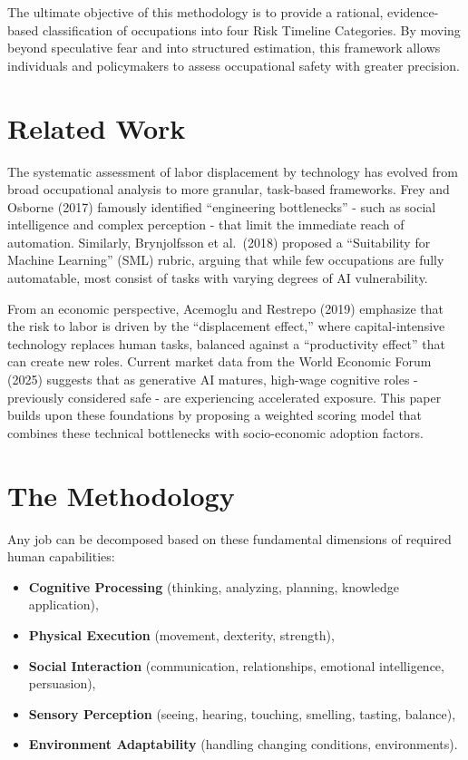 \documentclass[
  11pt,
]{article}
\providecommand{\tightlist}{%
  \setlength{\itemsep}{0pt}\setlength{\parskip}{0pt}}
\begin{document}
The ultimate objective of this methodology is to provide a rational,
evidence-based classification of occupations into four Risk Timeline
Categories. By moving beyond speculative fear and into structured
estimation, this framework allows individuals and policymakers to assess
occupational safety with greater precision.

\section{Related Work}\label{related-work}

The systematic assessment of labor displacement by technology has
evolved from broad occupational analysis to more granular, task-based
frameworks. Frey and Osborne (2017) famously identified ``engineering
bottlenecks'' - such as social intelligence and complex perception -
that limit the immediate reach of automation. Similarly, Brynjolfsson et
al.~(2018) proposed a ``Suitability for Machine Learning'' (SML) rubric,
arguing that while few occupations are fully automatable, most consist
of tasks with varying degrees of AI vulnerability.

From an economic perspective, Acemoglu and Restrepo (2019) emphasize
that the risk to labor is driven by the ``displacement effect,'' where
capital-intensive technology replaces human tasks, balanced against a
``productivity effect'' that can create new roles. Current market data
from the World Economic Forum (2025) suggests that as generative AI
matures, high-wage cognitive roles - previously considered safe - are
experiencing accelerated exposure. This paper builds upon these
foundations by proposing a weighted scoring model that combines these
technical bottlenecks with socio-economic adoption factors.

\section{The Methodology}\label{the-methodology}

Any job can be decomposed based on these fundamental dimensions of
required human capabilities:

\begin{itemize}
\tightlist
\item
  \textbf{Cognitive Processing} (thinking, analyzing, planning,
  knowledge application),
\item
  \textbf{Physical Execution} (movement, dexterity, strength),
\item
  \textbf{Social Interaction} (communication, relationships, emotional
  intelligence, persuasion),
\item
  \textbf{Sensory Perception} (seeing, hearing, touching, smelling,
  tasting, balance),
\item
  \textbf{Environment Adaptability} (handling changing conditions,
  environments).
\end{itemize}
\end{document}
